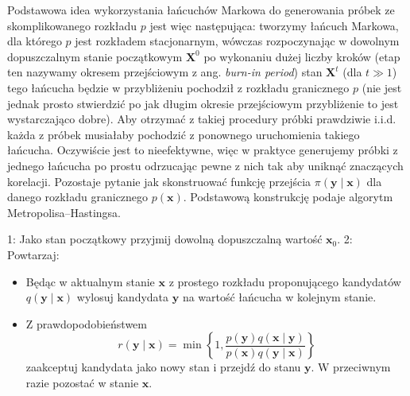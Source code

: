 \documentclass{myclass}
\numberwithin{equation}{subsection}
\begin{document}
Podstawowa idea wykorzystania łańcuchów Markowa do generowania próbek ze skomplikowanego rozkładu
\(p\) jest więc następująca: tworzymy łańcuch Markowa, dla którego \(p\) jest rozkładem
stacjonarnym, wówczas rozpoczynając w dowolnym dopuszczalnym stanie początkowym \(\bm{X}^0\) po
wykonaniu dużej liczby kroków (etap ten nazywamy okresem przejściowym z ang. \textit{burn-in
period}) stan \(\bm{X}^t\) (dla \(t \gg 1\)) tego łańcucha będzie w przybliżeniu pochodził z
rozkładu granicznego \(p\) (nie jest jednak prosto stwierdzić po jak długim okresie przejściowym
przybliżenie to jest wystarczająco dobre). Aby otrzymać z takiej procedury próbki prawdziwie i.i.d.
każda z próbek musiałaby pochodzić z ponownego uruchomienia takiego łańcucha. Oczywiście jest to
nieefektywne, więc w praktyce generujemy próbki z jednego łańcucha po prostu odrzucając pewne z nich
tak aby uniknąć znaczących korelacji. Pozostaje pytanie jak skonstruować funkcję przejścia
\(\pi(\bm{y} \mid \bm{x})\) dla danego rozkładu granicznego \(p(\bm{x})\). Podstawową konstrukcję
podaje algorytm Metropolisa--Hastingsa.
\begin{tcolorbox}[title=Algorytm Metropolisa--Hastingsa]
1: Jako stan początkowy przyjmij dowolną dopuszczalną wartość \(\bm{x}_0\). 2: Powtarzaj:
\begin{itemize}
    \item Będąc w aktualnym stanie \(\bm{x}\) z prostego rozkładu proponującego kandydatów
    \(q(\bm{y} \mid \bm{x})\) wylosuj kandydata \(\bm{y}\) na wartość łańcucha w kolejnym stanie.
    
    \item Z prawdopodobieństwem
    \begin{equation*}
        r(\bm{y} \mid \bm{x}) = \min\left\{1, \frac{p(\bm{y})q(\bm{x} \mid \bm{y})}{p(\bm{x})q(\bm{y} \mid \bm{x})}\right\}
    \end{equation*}
    zaakceptuj kandydata jako nowy stan i przejdź do stanu \(\bm{y}\). W przeciwnym razie pozostać w
    stanie \(\bm{x}\).
\end{itemize}
\end{tcolorbox}
\end{document}
